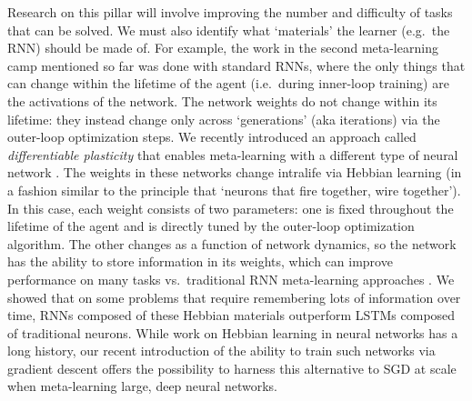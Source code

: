\documentclass{article}
\begin{document}
Research on this pillar will involve improving the number and difficulty of tasks that can be solved. We must also identify what `materials' the learner (e.g.\ the RNN) should be made of. For example, the work in the second meta-learning camp mentioned so far was done with standard RNNs, where the only things that can change within the lifetime of the agent (i.e.\ during inner-loop training) are the activations of the network. The network weights do not change within its lifetime: they instead change only across `generations' (aka iterations) via the outer-loop optimization steps. We recently introduced an approach called \emph{differentiable plasticity} that enables meta-learning with a different type of neural network \cite{miconi2018differentiable}. The weights in these networks change intralife via Hebbian learning (in a fashion similar to the principle that  `neurons that fire together, wire together'). In this case, each weight consists of two parameters: one is fixed throughout the lifetime of the agent and is directly tuned by the outer-loop optimization algorithm. The other changes as a function of network dynamics, so the network has the ability to store information in its weights, which can improve performance on many tasks vs.\ traditional RNN meta-learning approaches \cite{miconi2018differentiable}. We showed that on some problems that require remembering lots of information over time, RNNs composed of these Hebbian materials outperform LSTMs composed of traditional neurons. While work on Hebbian learning in neural networks has a long history, our recent introduction of the ability to train such networks via gradient descent offers the possibility to harness this alternative to SGD at scale when meta-learning large, deep neural networks. 
\end{document}
